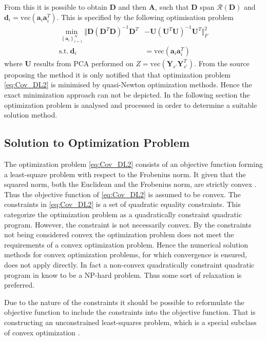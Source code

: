 From this it is possible to obtain $\textbf{D}$ and then $\textbf{A}$, such that $\textbf{D}$ span $\mathcal{R}(\textbf{D})$ and $\textbf{d}_i = \text{vec}(\textbf{a}_i\textbf{a}_i^T)$. This is specified by the following optimisation problem \cite{Balkan2015}
\begin{align}
\min_{\left\{\textbf{a}_i\right\}_{i = 1}^{N}}\Vert  \textbf{D}(\textbf{D}^T\textbf{D})^{-1}\textbf{D}^T &- \textbf{U}(\textbf{U}^T\textbf{U})^{-1}\textbf{U}^T \Vert_{F}^{2} \nonumber \\
\text{s.t.} \ \textbf{d}_i&=\text{vec}(\textbf{a}_i\textbf{a}_i^T)\label{eq:Cov_DL2}
\end{align}      
where $\textbf{U}$ results from PCA performed on $Z = \text{vec}\left( \mathbf{Y}_{s'} \mathbf{Y}_{s'}^T \right)$.
From the source \cite{Balkan 2015} proposing the method it is only notified that that optimization problem \eqref{eq:Cov_DL2} is minimised by quasi-Newton optimization methods. Hence the exact minimization approach can not be depicted.    
In the following section the optimization problem is analysed and processed in order to determine a suitable solution method. 
 
\subsection{Solution to Optimization Problem}
The optimization problem \eqref{eq:Cov_DL2} consists of an objective function forming a least-square problem with respect to the Frobenius norm. It given that the squared norm, both the Euclidean and the Frobenius norm, are strictly convex \cite[p.173]{norm_optimization}.
Thus the objective function of \eqref{eq:Cov_DL2} is assumed to be convex.
The constraints in \eqref{eq:Cov_DL2} is a set of quadratic equality constraints. 
This categorize the optimization problem as a quadratically constraint quadratic program. 
However, the constraint is not necessarily convex.  
By the constraints not being considered convex the optimization problem does not meet the requirements of a convex optimization problem. Hence the numerical solution methods for convex optimization problems, for which convergence is ensured, does not apply directly. In fact a non-convex quadratically constraint quadratic program in know to be a NP-hard problem\cite{qcqp}. Thus some sort of relaxation is preferred.  

Due to the nature of the constraints it should be possible to reformulate the objective function to include the constraints into the objective function. That is constructing an unconstrained least-squares problem, which is a special subclass of convex optimization \cite{cvxbook}.

